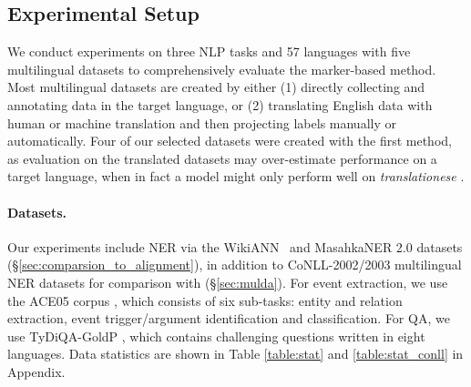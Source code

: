 \documentclass[11pt,dvipsnames]{article}
\begin{document}
\subsection{Experimental Setup}
\label{sec:experiment}

We conduct experiments on three NLP tasks and 57 languages with five multilingual datasets to comprehensively evaluate  the marker-based method. Most multilingual datasets are created  by either (1) directly collecting and annotating data in the target language, or (2) translating English data with human or machine translation and then projecting labels manually or automatically.  Four of our selected datasets  were created with the first method, as evaluation on the translated datasets may over-estimate performance on a target language, when in fact a model might only perform well on  {\em translationese} \citep{riley2020translationese}. 














\paragraph{Datasets.} Our experiments include NER via the WikiANN~\citep{pan2017wikiann,rahimi2019ner} and MasahkaNER 2.0 \cite{adelani2022masakhaner} datasets (\S \ref{sec:comparsion_to_alignment}), in addition to CoNLL-2002/2003 multilingual NER datasets \cite{sang2002conll,sang2003conll} for comparison with \citet{liu-2021-mulda} (\S \ref{sec:mulda}).  
For event extraction, we use the ACE05 corpus \cite{walker2006ace},  which consists of six sub-tasks: entity and relation extraction, event trigger/argument identification and classification.
For QA, we use TyDiQA-GoldP \cite{clark-etal-2020-tydi}, which contains challenging questions written in eight languages.
Data statistics are shown in Table \ref{table:stat} and \ref{table:stat_conll} in Appendix.
\end{document}
